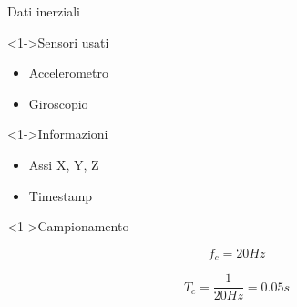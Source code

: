 \begin{tframe}{Dati inerziali}

    \begin{block}<1->{Sensori usati}
        
        \begin{minipage}{0.45\textwidth}
            \begin{itemize}
                \item Accelerometro
            \end{itemize}
        \end{minipage}%
        \hfill
        \begin{minipage}{0.55\textwidth}
            
            \begin{itemize}
                \item Giroscopio
            \end{itemize}
            
        \end{minipage}%
        
    \end{block}

    \begin{block}<1->{Informazioni}
        
        \begin{itemize}
            \item Assi X, Y, Z
            \item Timestamp
        \end{itemize}
        
    \end{block}

    \begin{block}<1->{Campionamento}

        \begin{minipage}{0.45\textwidth}
            $$f_c = 20Hz$$
        \end{minipage}%
        \hfill
        \begin{minipage}{0.55\textwidth}
            $$T_c = \frac{1}{20Hz} = 0.05s$$
        \end{minipage}%
        
    \end{block}


\end{tframe}